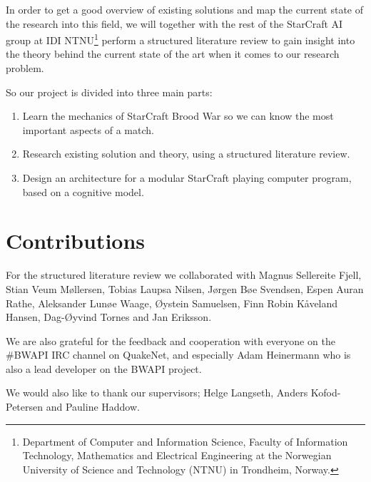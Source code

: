 In order to get a good overview of existing solutions and map the current state
of the research into this field, we will together with the rest of the StarCraft
AI group at IDI NTNU\footnote{Department of Computer and Information Science,
Faculty of Information Technology, Mathematics and Electrical Engineering at the
Norwegian University of Science and Technology (NTNU) in Trondheim, Norway.}
perform a structured literature review to gain insight into the theory behind
the current state of the art when it comes to our research problem.

So our project is divided into three main parts:
\begin{enumerate}
  \item Learn the mechanics of StarCraft Brood War so we can know the most
important aspects of a match.
  \item Research existing solution and theory, using a structured literature
review.
  \item Design an architecture for a modular StarCraft playing computer
program, based on a cognitive model.
\end{enumerate}

\section{Contributions}
\label{sec:contributions}
For the structured literature review we collaborated with Magnus Sellereite
Fjell, Stian Veum M{\o}llersen, Tobias Laupsa Nilsen, J{\o}rgen B{\o}e Svendsen,
Espen Auran Rathe, Aleksander Lun{\o}e Waage, {\O}ystein Samuelsen, Finn Robin
K{\aa}veland Hansen, Dag-{\O}yvind Tornes and Jan Eriksson.

We are also grateful for the feedback and cooperation with everyone on the
\#BWAPI IRC channel on QuakeNet, and especially Adam Heinermann who is also a
lead developer on the BWAPI project.

We would also like to thank our supervisors; Helge Langseth, Anders
Kofod-Petersen and Pauline Haddow.

